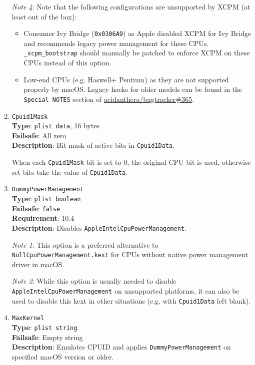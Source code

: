 \documentclass[]{article}
\providecommand{\tightlist}{%
  \setlength{\itemsep}{0pt}\setlength{\parskip}{0pt}}
\begin{document}
\begin{enumerate}
  \emph{Note 4}: Note that the following configurations are unsupported by XCPM (at least out of the box):

  \begin{itemize}
    \tightlist
    \item Consumer Ivy Bridge (\texttt{0x0306A9}) as Apple disabled XCPM for Ivy Bridge
      and recommends legacy power management for these CPUs. \texttt{\_xcpm\_bootstrap}
      should manually be patched to enforce XCPM on these CPUs instead of this option.
    \item Low-end CPUs (e.g. Haswell+ Pentium) as they are not supported properly by macOS.
      Legacy hacks for older models can be found in the \texttt{Special NOTES} section of
      \href{https://github.com/acidanthera/bugtracker/issues/365}{acidanthera/bugtracker\#365}.
  \end{itemize}

\item
  \texttt{Cpuid1Mask}\\
  \textbf{Type}: \texttt{plist\ data}, 16 bytes\\
  \textbf{Failsafe}: All zero\\
  \textbf{Description}: Bit mask of active bits in \texttt{Cpuid1Data}.

  When each \texttt{Cpuid1Mask} bit is set to 0, the original CPU bit is used,
  otherwise set bits take the value of \texttt{Cpuid1Data}.

\item
  \texttt{DummyPowerManagement}\\
  \textbf{Type}: \texttt{plist\ boolean}\\
  \textbf{Failsafe}: \texttt{false}\\
  \textbf{Requirement}: 10.4\\
  \textbf{Description}: Disables \texttt{AppleIntelCpuPowerManagement}.

  \emph{Note 1}: This option is a preferred alternative to
  \texttt{NullCpuPowerManagement.kext} for CPUs without native power
  management driver in macOS.

  \emph{Note 2}: While this option is usually needed to disable \texttt{AppleIntelCpuPowerManagement}
  on unsupported platforms, it can also be used to disable this kext in other situations
  (e.g. with \texttt{Cpuid1Data} left blank).

\item
  \texttt{MaxKernel}\\
  \textbf{Type}: \texttt{plist\ string}\\
  \textbf{Failsafe}: Empty string\\
  \textbf{Description}: Emulates CPUID and applies \texttt{DummyPowerManagement} on specified macOS version or older.


\end{enumerate}
\end{document}
